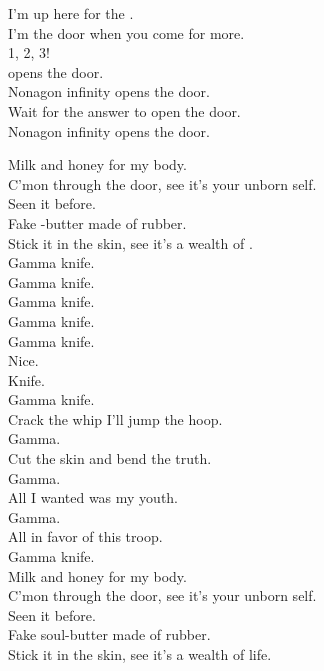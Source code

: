 I'm up here for the . \\
I'm the door when you come for more. \\

1, 2, 3! \\

 opens the door. \\
Nonagon infinity opens the door. \\
Wait for the answer to open the door. \\
Nonagon infinity opens the door. \\




Milk and honey for my body. \\
C'mon through the door, see it's your unborn self. \\
Seen it before. \\
Fake -butter made of rubber. \\
Stick it in the skin, see it's a wealth of . \\

Gamma knife. \\
Gamma knife. \\
Gamma knife. \\
Gamma knife. \\

Gamma knife. \\
Nice. \\
Knife. \\
Gamma knife. \\

Crack the whip I'll jump the hoop. \\
Gamma. \\
Cut the skin and bend the truth. \\
Gamma. \\
All I wanted was my youth. \\
Gamma. \\
All in favor of this troop. \\
Gamma knife. \\

Milk and honey for my body. \\
C'mon through the door, see it's your unborn self. \\
Seen it before. \\
Fake soul-butter made of rubber. \\
Stick it in the skin, see it's a wealth of life. \\

